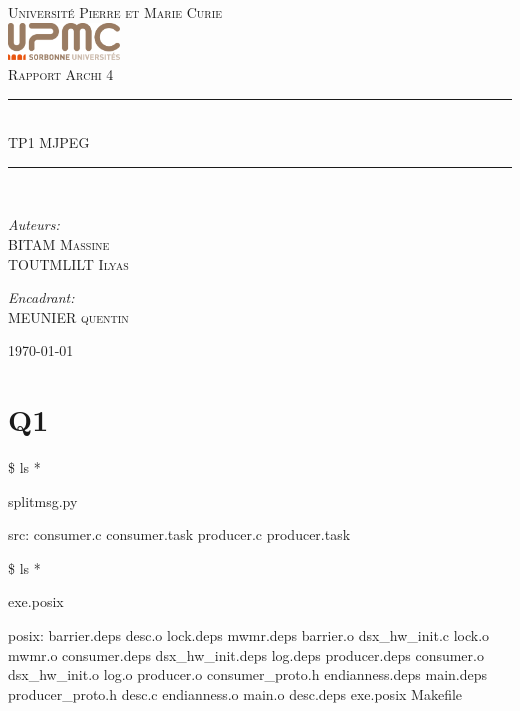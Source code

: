 \documentclass[12pt]{article}
\newcommand{\HRule}{\rule{\linewidth}{0.5mm}}
\begin{document}
\begin{titlepage}
  \begin{center}
    \textsc{\LARGE Université Pierre et Marie Curie}\\[1.5cm]
    \includegraphics[height=1cm]{upmc.png}\\[1.5cm]
    \textsc{\Large Rapport Archi 4 }\\[2cm]

    \HRule \\[1cm]
    \textsc{\huge TP1 MJPEG }\\[0.5cm]
    \HRule \\[1cm]

    \noindent
    \begin{minipage}[t]{0.55\textwidth}
      \begin{flushleft} \large
        \emph{Auteurs:}\\
        BITAM \textsc{Massine}\\
        TOUTMLILT \textsc{Ilyas}
      \end{flushleft}
    \end{minipage}%
    \begin{minipage}[t]{0.47\textwidth}
      \begin{flushright} \large
        \emph{Encadrant:} \\
        MEUNIER \textsc{quentin}
      \end{flushright}
    \end{minipage}

    \vfill

    {\large \today}
  \end{center}
\end{titlepage}

\section{Q1}

\$ ls *

splitmsg.py

src:
consumer.c  consumer.task  producer.c  producer.task

\$ ls *

exe.posix

posix:
barrier.deps      desc.o            lock.deps  mwmr.deps
barrier.o         dsx\_hw\_init.c     lock.o     mwmr.o
consumer.deps     dsx\_hw\_init.deps  log.deps   producer.deps
consumer.o        dsx\_hw\_init.o     log.o      producer.o
consumer\_proto.h  endianness.deps   main.deps  producer\_proto.h
desc.c            endianness.o      main.o
desc.deps         exe.posix         Makefile
\end{document}
